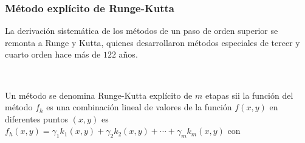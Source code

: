 \begin{frame}
  \frametitle{Método explícito de Runge-Kutta}
  La derivación sistemática de los métodos de un paso de orden
  superior se remonta a Runge y Kutta, quienes desarrollaron métodos
  especiales de tercer y cuarto orden hace más de $122$ años.

  \

  \begin{definition}
    Un método se denomina \alert{Runge-Kutta explícito de $m$ etapas}
    sii la función del método $f_{h}$ es una combinación lineal de
    valores de la función $f\left(x,y\right)$ en diferentes puntos
    $\left(x,y\right)$ es
    \begin{math}
      f_{h}\left(x,y\right)=
      \gamma_{1}k_{1}\left(x,y\right)+
      \gamma_{2}k_{2}\left(x,y\right)+
      \cdots+
      \gamma_{m}k_{m}\left(x,y\right)
    \end{math}
    con

    \


\end{definition}
\end{frame}
